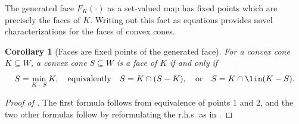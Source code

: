 \documentclass{article}
\theoremstyle{plain}
\newtheorem{corollary}[corollary]{Corollary}
\theoremstyle{definition}
\theoremstyle{remark}
\begin{document}
The generated face $F_K(\cdot)$ as a set-valued map has fixed points which are precisely the faces of $K$. Writing out this fact as equations provides novel characterizations for the faces of convex cones.
\begin{corollary}[Faces are fixed points of the generated face]
\label{loc:faces_are_fixed_points_of_the_generated_face.statement}
For a convex cone $K \subseteq W$, a convex cone $S \subseteq W$ is a face of $K$ if and only if
\begin{equation*}
S = \min_{K-S}K, \quad \text{equivalently} \quad S = K \cap (S-K), \quad\text{or}\quad S = K \cap \lin(K-S).
\end{equation*}
\end{corollary}
\begin{proof}[\hypertarget{loc:faces_are_fixed_points_of_the_generated_face.proof}{}Proof of ]

The first formula follows from equivalence of  points 1 and 2, and the two other formulas follow by reformulating the r.h.s. as in . 
\end{proof}
\end{document}
